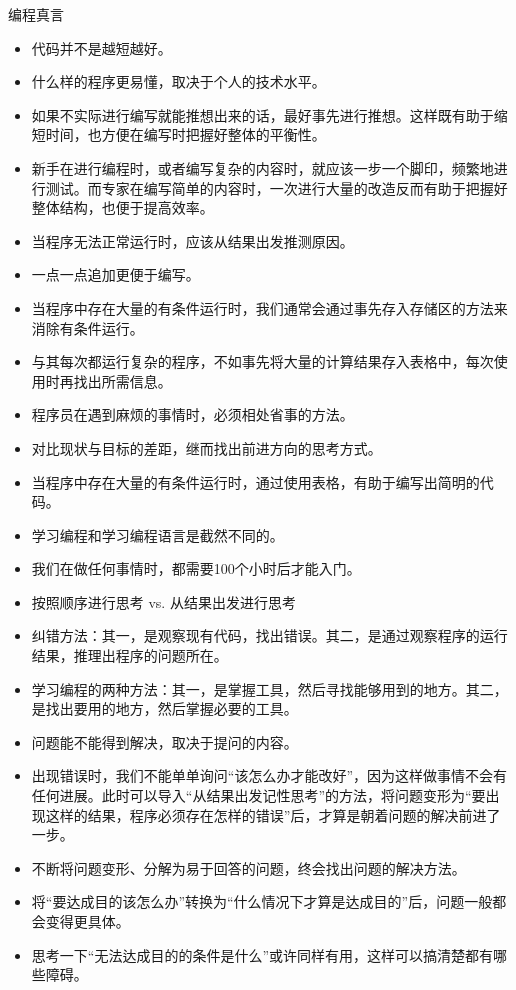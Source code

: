 \begin{frame}
\begin{block}{编程真言}
\begin{itemize}
      \item 代码并不是越短越好。
      \item 什么样的程序更易懂，取决于个人的技术水平。
      \item 如果不实际进行编写就能推想出来的话，最好事先进行推想。这样既有助于缩短时间，也方便在编写时把握好整体的平衡性。
      \item 新手在进行编程时，或者编写复杂的内容时，就应该一步一个脚印，频繁地进行测试。而专家在编写简单的内容时，一次进行大量的改造反而有助于把握好整体结构，也便于提高效率。
      \item 当程序无法正常运行时，应该从结果出发推测原因。
      \item 一点一点追加更便于编写。
      \item 当程序中存在大量的有条件运行时，我们通常会通过事先存入存储区的方法来消除有条件运行。
      \item 与其每次都运行复杂的程序，不如事先将大量的计算结果存入表格中，每次使用时再找出所需信息。
      \item 程序员在遇到麻烦的事情时，必须相处省事的方法。
      \item 对比现状与目标的差距，继而找出前进方向的思考方式。
      \item 当程序中存在大量的有条件运行时，通过使用表格，有助于编写出简明的代码。
      \item 学习编程和学习编程语言是截然不同的。
      \item 我们在做任何事情时，都需要100个小时后才能入门。
      \item 按照顺序进行思考 vs. 从结果出发进行思考
      \item 纠错方法：其一，是观察现有代码，找出错误。其二，是通过观察程序的运行结果，推理出程序的问题所在。
      \item 学习编程的两种方法：其一，是掌握工具，然后寻找能够用到的地方。其二，是找出要用的地方，然后掌握必要的工具。
      \item 问题能不能得到解决，取决于提问的内容。
      \item 出现错误时，我们不能单单询问“该怎么办才能改好”，因为这样做事情不会有任何进展。此时可以导入“从结果出发记性思考”的方法，将问题变形为“要出现这样的结果，程序必须存在怎样的错误”后，才算是朝着问题的解决前进了一步。
      \item 不断将问题变形、分解为易于回答的问题，终会找出问题的解决方法。
      \item 将“要达成目的该怎么办”转换为“什么情况下才算是达成目的”后，问题一般都会变得更具体。
      \item 思考一下“无法达成目的的条件是什么”或许同样有用，这样可以搞清楚都有哪些障碍。

\end{itemize}
\end{block}
\end{frame}
